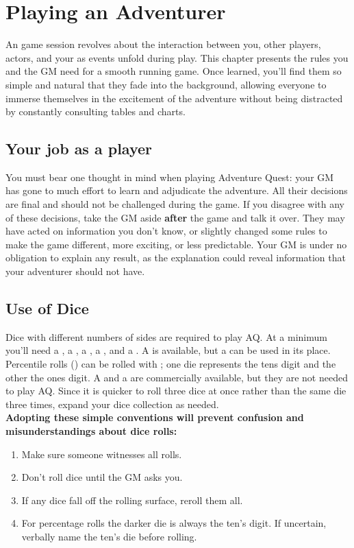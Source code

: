 \chapter{Playing an Adventurer}
\label{ch:play-adventurer}
\setlength{\columnsep}{\defcolwidth}
\begin{multicols*}{2}
An \aq game session revolves about the interaction between you, other players, actors, and your  as events unfold during play. This chapter presents the rules you and the GM need for a smooth running game. Once learned, you'll find them so simple and natural that they fade into the background, allowing everyone to immerse themselves in the excitement of the adventure without being distracted by constantly consulting tables and charts.
\section{Your job as a player}
You must bear one thought in mind when playing Adventure Quest: your GM has gone to much effort to learn and adjudicate the adventure. All their decisions are final and
should not be challenged during the game. If you disagree with any of these decisions, take the GM aside \textbf{after} the game and talk it over. They may have acted on information you don't know, or slightly changed some rules to make the game  different, more exciting, or less predictable. Your GM is under no obligation to explain any result, as the explanation could reveal information that your adventurer should not have.
\section{Use of Dice}
Dice with different numbers of sides are required to play AQ. At a minimum you'll need a , a , a , a , and a . A  is available, but a  can be used in its
place. Percentile rolls () can be rolled with  ; one die represents the tens digit and the other the ones digit. A  and a  are commercially available, but they are not needed to play AQ. Since it is quicker to roll three dice at once rather
than the same die three times, expand your dice collection as needed.\\
\textbf{Adopting these simple conventions will prevent confusion and misunderstandings about dice rolls:}
\begin{enumerate}[leftmargin=12pt]
\item Make sure someone witnesses all rolls.
\item Don't roll dice until the GM asks you.
\item If any dice fall off the rolling surface, reroll them all.
\item For percentage rolls the darker die is always the ten's digit. If uncertain, verbally name the ten's die before rolling.
\end{enumerate}

\end{multicols*}
